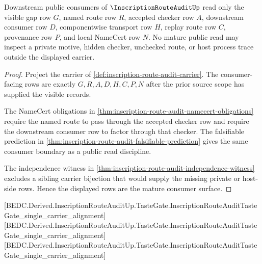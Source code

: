 \begin{theorem}
\label{thm:inscription-route-audit-mature-consumer-surface}
Downstream public consumers of $\InscriptionRouteAuditUp$ read only the
visible gap row $G$, named route row $R$, accepted checker row $A$, downstream
consumer row $D$, componentwise transport row $H$, replay route row $C$,
provenance row $P$, and local NameCert row $N$. No mature public read may
inspect a private motive, hidden checker, unchecked route, or host process
trace outside the displayed carrier.
\end{theorem}
\begin{proof}
Project the carrier of \autoref{def:inscription-route-audit-carrier}. The
consumer-facing rows are exactly $G,R,A,D,H,C,P,N$ after the prior source
scope has supplied the visible records.

The NameCert obligations in
\autoref{thm:inscription-route-audit-namecert-obligations} require the named
route to pass through the accepted checker row and require the downstream
consumer row to factor through that checker. The falsifiable prediction in
\autoref{thm:inscription-route-audit-falsifiable-prediction} gives the same
consumer boundary as a public read discipline.

The independence witness in
\autoref{thm:inscription-route-audit-independence-witness} excludes a sibling
carrier bijection that would supply the missing private or host-side rows.
Hence the displayed rows are the mature consumer surface.
\end{proof}

[BEDC.Derived.InscriptionRouteAuditUp.TasteGate.InscriptionRouteAuditTasteGate\_single\_carrier\_alignment]
[BEDC.Derived.InscriptionRouteAuditUp.TasteGate.InscriptionRouteAuditTasteGate\_single\_carrier\_alignment]
[BEDC.Derived.InscriptionRouteAuditUp.TasteGate.InscriptionRouteAuditTasteGate\_single\_carrier\_alignment]

